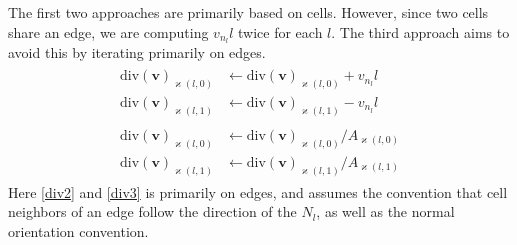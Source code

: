 \documentclass[12pt]{article}
\begin{document}
The first two approaches are primarily based on cells. However, since two cells share an edge, we are computing $v_{n_l}l$ twice for each $l$. The third approach aims to avoid this by iterating primarily on edges.
\begin{gather}
  \begin{split}
    \label{div2}
    \text{div}(\bm{v})_{\varkappa(l,0)} &\leftarrow \text{div}(\bm{v})_{\varkappa(l,0)} + v_{n_l}l\\
    \text{div}(\bm{v})_{\varkappa(l,1)} &\leftarrow \text{div}(\bm{v})_{\varkappa(l,1)} - v_{n_l}l
  \end{split}\\
  \begin{split}
    \label{div3}
    \text{div}(\bm{v})_{\varkappa(l,0)} &\leftarrow \text{div}(\bm{v})_{\varkappa(l,0)} / A_{\varkappa(l,0)}\\
    \text{div}(\bm{v})_{\varkappa(l,1)} &\leftarrow \text{div}(\bm{v})_{\varkappa(l,1)} / A_{\varkappa(l,1)}
  \end{split}
\end{gather}
Here \cref{div2} and \cref{div3} is primarily on edges, and assumes the convention that cell neighbors of an edge follow the direction of the $N_l$, as well as the normal orientation convention.
\end{document}
